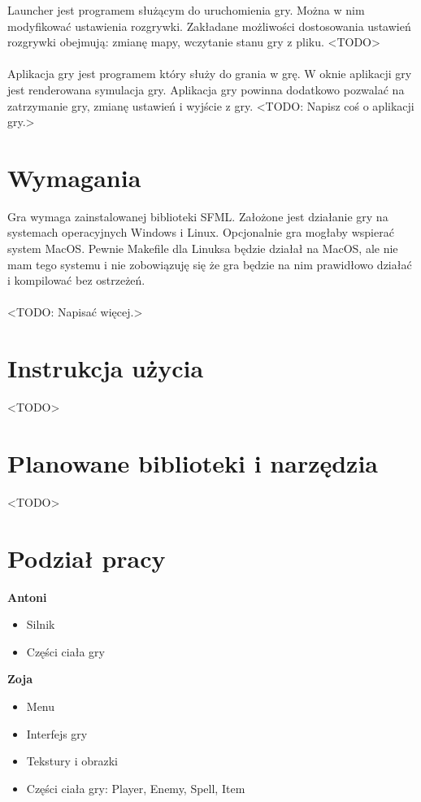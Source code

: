 \documentclass[12pt, titlepage]{article}
\begin{document}
\noindent
Launcher jest programem służącym do uruchomienia gry.
Można w nim modyfikować ustawienia rozgrywki. Zakładane
możliwości dostosowania ustawień rozgrywki obejmują:
zmianę mapy, wczytanie stanu gry z pliku. <TODO>
\\~\\
Aplikacja gry jest programem który służy
do grania w grę. W oknie aplikacji gry jest
renderowana symulacja gry. Aplikacja gry
powinna dodatkowo pozwalać na zatrzymanie
gry, zmianę ustawień i wyjście z gry. <TODO:
Napisz coś o aplikacji gry.>

\section{Wymagania}
Gra wymaga zainstalowanej biblioteki
SFML. Założone jest działanie gry
na systemach operacyjnych Windows i
Linux. Opcjonalnie gra mogłaby wspierać
system MacOS. Pewnie Makefile dla Linuksa
będzie działał na MacOS, ale nie mam tego
systemu i nie zobowiązuję się że gra będzie
na nim prawidłowo działać i kompilować
bez ostrzeżeń.
\\~\\
<TODO: Napisać więcej.>

\newpage
\section{Instrukcja użycia}
<TODO>

\section{Planowane biblioteki i narzędzia}
<TODO>

\section{Podział pracy}
\textbf{Antoni}
\begin{itemize}
	\item Silnik
	\item Części ciała gry
\end{itemize}
 
\noindent
\textbf{Zoja}
\begin{itemize}
	\item Menu
	\item Interfejs gry
	\item Tekstury i obrazki
	\item Części ciała gry: Player, Enemy, Spell, Item
\end{itemize}
\end{document}
